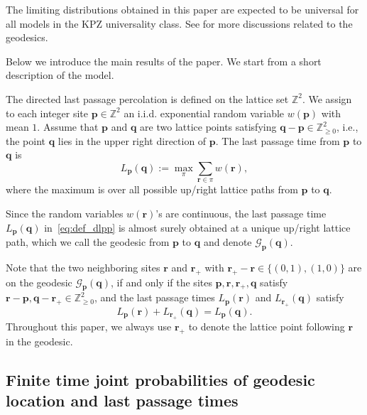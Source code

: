 \documentclass{article}
\numberwithin{equation}{section}
\newcommand{\gd}{{\mathcal{G}}}
\newcommand{\intZ}{\mathbb{Z}}
\begin{document}
The limiting distributions obtained in this paper are expected to be universal for all models in the KPZ universality class. See \cite{Dauvergne-Virag21} for more discussions related to the geodesics.


\bigskip
Below we introduce the main results of the paper. We start from a short description of the model.


The directed last passage percolation is defined on the lattice set $\intZ^2$. We assign to each integer site $\mathbf{p}\in\intZ^2$ an i.i.d. exponential random variable $w(\mathbf{p})$ with mean $1$. Assume that $\mathbf{p}$ and $\mathbf{q}$ are two lattice points satisfying $\mathbf{q}-\mathbf{p}\in\intZ_{\ge 0}^2$, i.e., the point $\mathbf{q}$ lies in the upper right direction of $\mathbf{p}$. The last passage time from  $\mathbf{p}$ to $\mathbf{q}$ is
\begin{equation}
	\label{eq:def_dlpp}
	L_{\mathbf{p}}(\mathbf{q}):=\max_{\pi} \sum_{\mathbf{r}\in\pi} w(\mathbf{r}),
\end{equation}
where the maximum is over all possible up/right lattice paths from $\mathbf{p}$ to $\mathbf{q}$.

Since the random variables $w(\mathbf{r})$'s are continuous, the last passage time $L_{\mathbf{p}}(\mathbf{q})$ in~\eqref{eq:def_dlpp} is almost surely obtained at a unique up/right lattice path, which we call the geodesic from $\mathbf{p}$ to $\mathbf{q}$ and denote $\gd_{\mathbf{p}}(\mathbf{q})$.

Note that the two neighboring sites $\mathbf{r}$ and $\mathbf{r}_+$ with $\mathbf{r}_+-\mathbf{r}\in\{(0,1), (1,0)\}$ are on the geodesic $\gd_{\mathbf{p}}(\mathbf{q})$, if and only if  the sites $\mathbf{p},\mathbf{r},\mathbf{r}_+,\mathbf{q}$ satisfy $\mathbf{r}-\mathbf{p},\mathbf{q}-\mathbf{r}_+\in\intZ_{\ge 0}^2$, and the last passage times $L_{\mathbf{p}}(\mathbf{r})$ and $L_{\mathbf{r}_+}(\mathbf{q})$ satisfy
\begin{equation}
	\label{eq:dlpp_split}
     L_{\mathbf{p}}(\mathbf{r})+L_{\mathbf{r}_+}(\mathbf{q})
	=L_{\mathbf{p}}(\mathbf{q}).
\end{equation}
Throughout this paper, we always use $\mathbf{r}_+$ to denote the lattice point following $\mathbf{r}$ in the geodesic.

\subsection{Finite time joint probabilities of geodesic location and last passage times}
\end{document}

